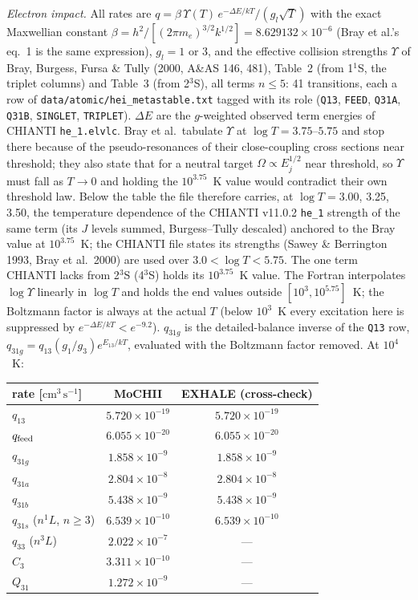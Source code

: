 \documentclass[english,a4paper]{my_memo}
\newcommand{\code}[1]{\texttt{#1}}
\newcommand{\cmc}{\mathrm{cm^{3}\,s^{-1}}}
\begin{document}
\emph{Electron impact.}  All rates are $q = \beta\,\Upsilon(T)\,e^{-\Delta
E/kT}/(g_l\sqrt T)$ with the exact Maxwellian constant $\beta =
h^2/[(2\pi m_e)^{3/2}k^{1/2}] = 8.629132{\times}10^{-6}$ (Bray et al.'s
eq.~1 is the same expression), $g_l = 1$ or 3, and the effective collision
strengths $\Upsilon$ of Bray, Burgess, Fursa \& Tully (2000, A\&AS 146, 481),
Table~2 (from 1$^1$S, the triplet columns) and Table~3 (from 2$^3$S), all
terms $n\le5$: 41 transitions, each a row of \code{data/atomic/hei\_metastable.txt}
tagged with its role (\code{Q13}, \code{FEED}, \code{Q31A}, \code{Q31B},
\code{SINGLET}, \code{TRIPLET}).  $\Delta E$ are the $g$-weighted observed
term energies of CHIANTI \code{he\_1.elvlc}.  Bray et al.\ tabulate
$\Upsilon$ at $\log T = 3.75$--$5.75$ and stop there because of the
pseudo-resonances of their close-coupling cross sections near threshold;
they also state that for a neutral target $\Omega\propto E_j^{1/2}$ near
threshold, so $\Upsilon$ must fall as $T\rightarrow0$ and holding the
$10^{3.75}$~K value would contradict their own threshold law.  Below the
table the file therefore carries, at $\log T = 3.00$, 3.25, 3.50, the
temperature dependence of the CHIANTI v11.0.2 \code{he\_1} strength of the
same term (its $J$ levels summed, Burgess--Tully descaled) anchored to the
Bray value at $10^{3.75}$~K; the CHIANTI file states its strengths (Sawey \&
Berrington 1993, Bray et al.\ 2000) are used over $3.0<\log T<5.75$.  The
one term CHIANTI lacks from 2$^3$S (4$^3$S) holds its $10^{3.75}$~K value.
The Fortran interpolates $\log\Upsilon$ linearly in $\log T$ and holds the
end values outside $[10^3, 10^{5.75}]$~K; the Boltzmann factor is always at
the actual $T$ (below $10^3$~K every excitation here is suppressed by
$e^{-\Delta E/kT}<e^{-9.2}$).  $q_{31g}$ is the detailed-balance inverse of
the \code{Q13} row, $q_{31g} = q_{13}(g_1/g_3)e^{E_{13}/kT}$, evaluated with
the Boltzmann factor removed.  At $10^4$~K:
\begin{center}
\begin{tabular}{lcc}
\toprule
rate [$\cmc$] & MoCHII & EXHALE (cross-check) \\
\midrule
$q_{13}$                    & $5.720{\times}10^{-19}$ & $5.720{\times}10^{-19}$ \\
$q_{\rm feed}$              & $6.055{\times}10^{-20}$ & $6.055{\times}10^{-20}$ \\
$q_{31g}$                   & $1.858{\times}10^{-9}$  & $1.858{\times}10^{-9}$ \\
$q_{31a}$                   & $2.804{\times}10^{-8}$  & $2.804{\times}10^{-8}$ \\
$q_{31b}$                   & $5.438{\times}10^{-9}$  & $5.438{\times}10^{-9}$ \\
$q_{31s}$ ($n^1L$, $n\ge3$) & $6.539{\times}10^{-10}$ & $6.539{\times}10^{-10}$ \\
$q_{33}$ ($n^3L$)           & $2.022{\times}10^{-7}$  & --- \\
$C_3$                       & $3.311{\times}10^{-10}$ & --- \\
$Q_{31}$                    & $1.272{\times}10^{-9}$  & --- \\
\bottomrule
\end{tabular}
\end{center}
\end{document}
